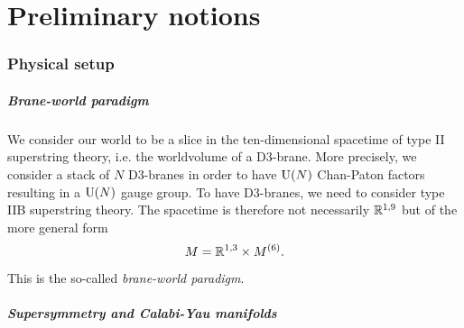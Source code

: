 \part{Preliminary notions}


\section{Physical setup}

    \subsubsection*{Brane-world paradigm}

        We consider our world to be a slice in the ten-dimensional spacetime of type II superstring theory, i.e. the worldvolume of a D$3$-brane. More precisely, we consider a stack of $N$ D$3$-branes in order to have $\text{U}(N)$ Chan-Paton factors resulting in a $\text{U}(N)$ gauge group. To have D$3$-branes, we need to consider type IIB superstring theory. The spacetime is therefore not necessarily $\mathbb{R}^{1,9}$ but of the more general form
        \begin{equation*}
            M = \mathbb{R}^{1,3}\times M^{(6)}.\label{spacetimedecomp}
        \end{equation*}
        This is the so-called \emph{brane-world paradigm}. %

    \subsubsection*{Supersymmetry and Calabi-Yau manifolds}
    
